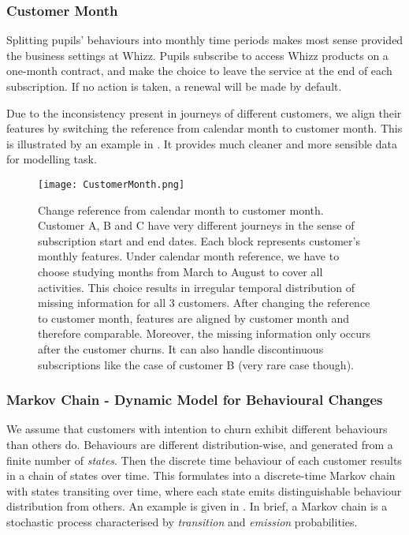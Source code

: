 \subsubsection{Customer Month}

Splitting pupils' behaviours into monthly time periods makes most sense provided the business settings at Whizz. Pupils subscribe to access Whizz products on a one-month contract, and make the choice to leave the service at the end of each subscription. If no action is taken, a renewal will be made by default.

Due to the inconsistency present in journeys of different customers, we align their features by switching the reference from calendar month to customer month. This is illustrated by an example in . It provides much cleaner and more sensible data for modelling task. 

\begin{figure}[!h]
\centering
\texttt{[image: CustomerMonth.png]}
\caption{Change reference from calendar month to customer month. Customer A, B and C have very different journeys in the sense of subscription start and end dates. Each block represents customer's monthly features. Under calendar month reference, we have to choose studying months from March to August to cover all activities. This choice results in irregular temporal distribution of missing information for all 3 customers. After changing the reference to customer month, features are aligned by customer month and therefore comparable. Moreover, the missing information only occurs after the customer churns. It can also handle discontinuous subscriptions like the case of customer B (very rare case though).}
\label{fig:customerMonth}
\end{figure}

\subsubsection{Markov Chain - Dynamic Model for Behavioural Changes}

We assume that customers with intention to churn exhibit different behaviours than others do. Behaviours are different distribution-wise, and generated from a finite number of \textit{states}. Then the discrete time behaviour of each customer results in a chain of states over time. This formulates into a discrete-time Markov chain with states transiting over time, where each state emits distinguishable behaviour distribution from others. An example is given in . In brief, a Markov chain is a stochastic process characterised by \textit{transition} and \textit{emission} probabilities.

